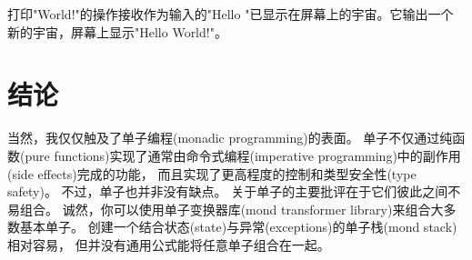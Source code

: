 打印"World!"的操作接收作为输入的"Hello "已显示在屏幕上的宇宙。它输出一个新的宇宙，屏幕上显示"Hello World!"。

\section{结论}

当然，我仅仅触及了单子编程(monadic programming)的表面。
单子不仅通过纯函数(pure functions)实现了通常由命令式编程(imperative programming)中的副作用(side effects)完成的功能，
而且实现了更高程度的控制和类型安全性(type safety)。
不过，单子也并非没有缺点。
关于单子的主要批评在于它们彼此之间不易组合。
诚然，你可以使用单子变换器库(mond transformer library)来组合大多数基本单子。
创建一个结合状态(state)与异常(exceptions)的单子栈(mond stack)相对容易，
但并没有通用公式能将任意单子组合在一起。
